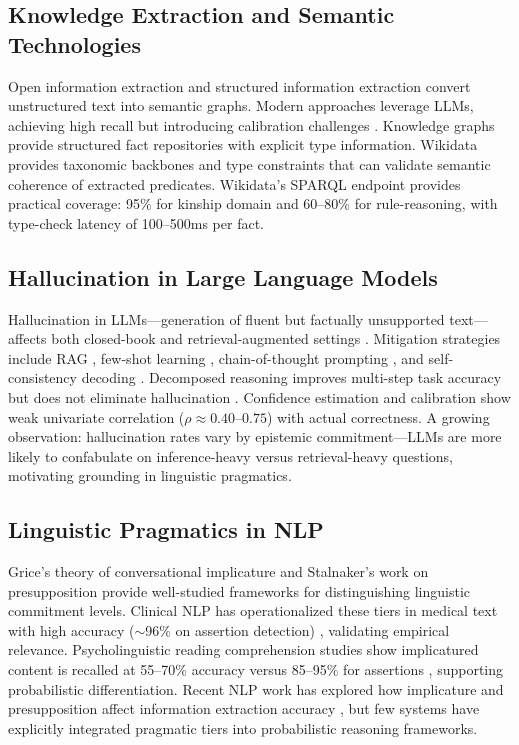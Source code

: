 \documentclass[11pt,letterpaper]{article}
\begin{document}
\subsection{Knowledge Extraction and Semantic Technologies}

Open information extraction \citep{Banko2007} and structured information extraction \citep{Finkel2005} convert unstructured text into semantic graphs. Modern approaches leverage LLMs, achieving high recall but introducing calibration challenges \citep{Pradhan2013}. Knowledge graphs \citep{Hogan2021} provide structured fact repositories with explicit type information. Wikidata \citep{Wikidata2025} provides taxonomic backbones and type constraints that can validate semantic coherence of extracted predicates. Wikidata's SPARQL endpoint provides practical coverage: 95\% for kinship domain and 60--80\% for rule-reasoning, with type-check latency of 100--500ms per fact.

\subsection{Hallucination in Large Language Models}

Hallucination in LLMs---generation of fluent but factually unsupported text---affects both closed-book and retrieval-augmented settings \citep{Kubbra2024,Liu2023}. Mitigation strategies include RAG \citep{Lewis2020}, few-shot learning \citep{Brown2020}, chain-of-thought prompting \citep{Wei2022}, and self-consistency decoding \citep{Wang2022}. Decomposed reasoning improves multi-step task accuracy but does not eliminate hallucination \citep{Wang2022}. Confidence estimation and calibration \citep{Zhang2026,Tao2024} show weak univariate correlation ($\rho\approx0.40$--$0.75$) with actual correctness. A growing observation: hallucination rates vary by epistemic commitment---LLMs are more likely to confabulate on inference-heavy versus retrieval-heavy questions, motivating grounding in linguistic pragmatics.

\subsection{Linguistic Pragmatics in NLP}

Grice's theory of conversational implicature \citep{Grice1975} and Stalnaker's work on presupposition \citep{Stalnaker1978} provide well-studied frameworks for distinguishing linguistic commitment levels. Clinical NLP has operationalized these tiers in medical text with high accuracy ($\sim$96\% on assertion detection) \citep{Sharifirad2025}, validating empirical relevance. Psycholinguistic reading comprehension studies show implicatured content is recalled at 55--70\% accuracy versus 85--95\% for assertions \citep{Cholia2017,Kutas2011}, supporting probabilistic differentiation. Recent NLP work has explored how implicature and presupposition affect information extraction accuracy \citep{Bowman2015,Williams2018}, but few systems have explicitly integrated pragmatic tiers into probabilistic reasoning frameworks.
\end{document}
